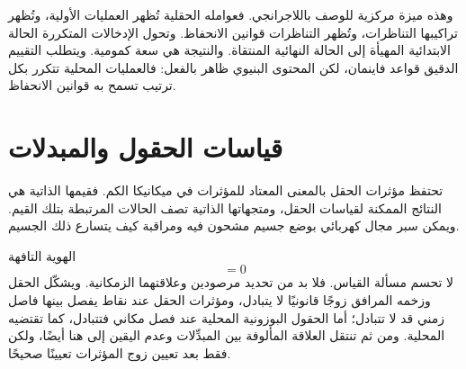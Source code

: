 وهذه ميزة مركزية للوصف باللاجرانجي. فعوامله الحقلية تُظهر العمليات الأولية، وتُظهر تراكيبها التناظرات، وتُظهر التناظرات قوانين الانحفاظ. وتحول الإدخالات المتكررة الحالة الابتدائية المهيأة إلى الحالة النهائية المنتقاة. والنتيجة هي سعة كمومية. ويتطلب التقييم الدقيق قواعد فاينمان، لكن المحتوى البنيوي ظاهر بالفعل: فالعمليات المحلية تتكرر بكل ترتيب تسمح به قوانين الانحفاظ.

\section{قياسات الحقول والمبدلات}

تحتفظ مؤثرات الحقل بالمعنى المعتاد للمؤثرات في ميكانيكا الكم. فقيمها الذاتية هي النتائج الممكنة لقياسات الحقل، ومتجهاتها الذاتية تصف الحالات المرتبطة بتلك القيم. ويمكن سبر مجال كهربائي بوضع جسيم مشحون فيه ومراقبة كيف يتسارع ذلك الجسيم.

\begin{classroomqa}
\end{classroomqa}

الهوية التافهة
\begin{equation}
[\phi(x),\phi(x)]=0
\end{equation}
لا تحسم مسألة القياس. فلا بد من تحديد مرصودين وعلاقتهما الزمكانية. ويشكّل الحقل وزخمه المرافق زوجًا قانونيًا لا يتبادل، ومؤثرات الحقل عند نقاط يفصل بينها فاصل زمني قد لا تتبادل؛ أما الحقول البوزونية المحلية عند فصل مكاني فتتبادل، كما تقتضيه المحلية. ومن ثم تنتقل العلاقة المألوفة بين المبدِّلات وعدم اليقين إلى هنا أيضًا، ولكن فقط بعد تعيين زوج المؤثرات تعيينًا صحيحًا.

\begin{classroomqa}
\end{classroomqa}

